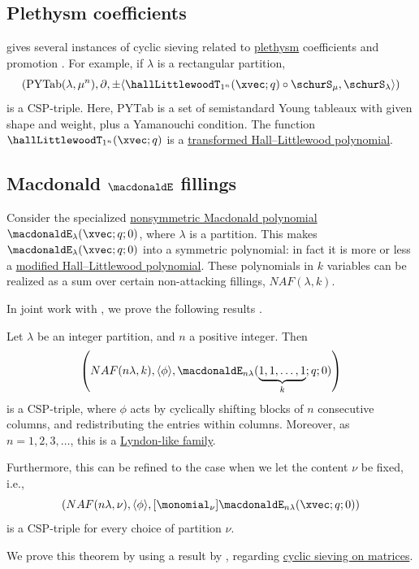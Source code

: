 \subsection[cspPlethysmCoefficients]{Plethysm coefficients}

 gives several instances of cyclic sieving related to
\hyperref[plethysm]{plethysm} coefficients and promotion \cite{Rush2018}.
For example, if $\lambda$ is a rectangular partition,
\[
\left( \mathrm{PYTab}(\lambda,\mu^n), \partial,
\pm \langle \hallLittlewoodT_{1^n}(\xvec;q) \circ \schurS_\mu,
\schurS_\lambda \rangle \right)
\]
is a CSP-triple.
Here, $\mathrm{PYTab}$ is a set of semistandard Young tableaux with given
shape and weight, plus a Yamanouchi condition.
The function $\hallLittlewoodT_{1^n}(\xvec;q)$ is a \hyperref[hallLittlewoodT]{transformed Hall--Littlewood polynomial}.



\subsection[cspMacdonaldE]{Macdonald $\macdonaldE$ fillings}

Consider the specialized \hyperref[macdonaldE]{nonsymmetric Macdonald polynomial}
$\macdonaldE_{\lambda}(\xvec;q;0)$, where $\lambda$ is a partition.
This makes $\macdonaldE_{\lambda}(\xvec;q;0)$ into a symmetric polynomial:
in fact it is more or less a \hyperref[hallLittlewoodH]{modified Hall--Littlewood polynomial}.
These polynomials in $k$ variables can be realized as a sum over certain non-attacking fillings, $NAF(\lambda,k)$.

In joint work with , we prove the following results
\cite{AlexanderssonUhlin2020}.

\begin{theorem}
Let $\lambda$ be an integer partition, and $n$ a positive integer.
Then
\[
\left(
NAF(n\lambda,k), \langle \phi \rangle,\macdonaldE_{n\lambda}(\underbrace{1,1,\dotsc,1}_k;q;0)
\right)
\]
is a CSP-triple, where $\phi$ acts by cyclically shifting blocks of $n$ consecutive columns,
and redistributing the entries within columns.
Moreover, as $n=1,2,3,\dotsc$, this is a \hyperref[lyndonCSP]{Lyndon-like family}.

Furthermore, this can be refined to the case when we let the content $\nu$ be fixed,
i.e.,
\[
\left(
NAF(n\lambda,\nu), \langle \phi \rangle,[\monomial_\nu]\macdonaldE_{n\lambda}(\xvec;q;0)
\right)
\]
is a CSP-triple for every choice of partition $\nu$.
\end{theorem}
We prove this theorem by using a result by  \cite{Rhoades2010b},
regarding \hyperref[csp01Matrices]{cyclic sieving on matrices}.

